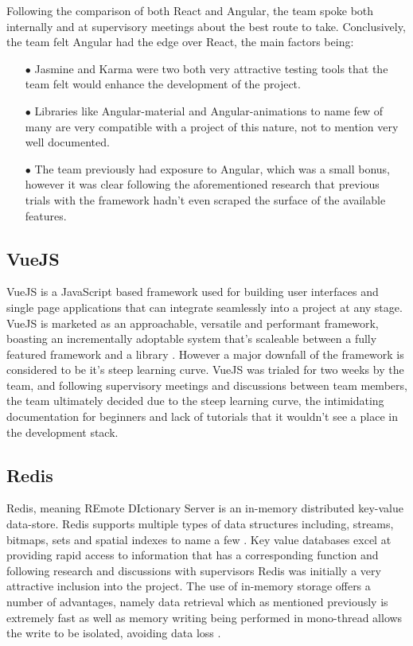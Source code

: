 Following the comparison of both React and Angular, the team spoke both internally and at supervisory meetings about the best route to take. Conclusively, the team felt Angular had the edge over React, the main factors being:

\begin{enumerate}
    \item[$\bullet$] Jasmine and Karma were two both very attractive testing tools that the team felt would enhance the development of the project.
    \item[$\bullet$] Libraries like Angular-material and Angular-animations to name few of many are very compatible with a project of this nature, not to mention very well documented. 
    \item[$\bullet$] The team previously had exposure to Angular, which was a small bonus, however it was clear following the aforementioned research that previous trials with the framework hadn't even scraped the surface of the available features. 
\end{enumerate}

\subsection{VueJS}
VueJS is a JavaScript based framework used for building user interfaces and single page applications that can integrate seamlessly into a project at any stage. VueJS is marketed as an approachable, versatile and performant framework, boasting an incrementally adoptable system that's scaleable between a fully featured framework and a library \cite{VUE}. However a major downfall of the framework is considered to be it's steep learning curve. VueJS was trialed for two weeks by the team, and following supervisory meetings and discussions between team members, the team ultimately decided due to the steep learning curve, the intimidating documentation for beginners and lack of tutorials that it wouldn't see a place in the development stack.

\subsection{Redis}
Redis, meaning REmote DIctionary Server is an in-memory distributed key-value data-store. Redis supports multiple types of data structures including, streams, bitmaps, sets and spatial indexes to name a few \cite{REDIS_IO}. Key value databases excel at providing rapid access to information that has a corresponding function and following research and discussions with supervisors Redis was initially a very attractive inclusion into the project. The use of in-memory storage offers a number of advantages, namely data retrieval which as mentioned previously is extremely fast as well as memory writing being performed in mono-thread allows the write to be isolated, avoiding data loss \cite{REDIS}.

